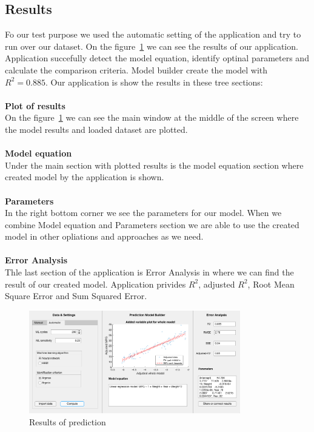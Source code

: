         \subsection{Results}\label{subsec:result}
        Fo our test purpose we used the automatic setting of the application and try to run
        over our dataset. On the figure~\ref{fig:results} we can see the results of our application.
        Application succefully detect the model equation, identify optinal parameters and 
        calculate the comparison criteria. Model builder create the model with $R^2 = 0.885$.
        Our application is show the results in these tree sections:\\
        \\
        \textbf{Plot of results}\\
        On the figure~\ref{fig:results} we can see the main window at the middle of the screen
        where the model results and loaded dataset are plotted.\\
        \\
        \textbf{Model equation}\\
        Under the main section with plotted results is the model equation section where
        created model by the application is shown.\\
        \\
        \textbf{Parameters}\\
        In the right bottom corner we see the parameters for our model. When we combine 
        Model equation and Parameters section we are able to use the created model in other
        opliations and approaches as we need.\\
        \\
        \textbf{Error Analysis}\\
        Thle last section of the application is Error Analysis in where we can find the 
        result of our created model. Application privides $R^2$, adjusted $R^2$,
        Root Mean Square Error and Sum Squared Error.
        \begin{center}
            \begin{figure}[!ht]
                \centering
                \includegraphics[width=0.82\textwidth]{figures/result.png}
                \caption{Results of prediction}
                \label{fig:results}
            \end{figure}
        \end{center}